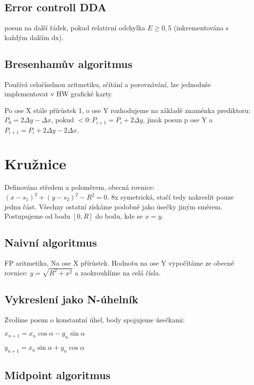 \documentclass[a4paper, 11pt]{report}
\begin{document}
\subsection{Error controll DDA}

posun na další řádek, pokud relativní odchylka $ E \geq 0,5$ (inkrementována s každým dalším dx).

\subsection{Bresenhamův algoritmus}

Používá celočíselnou aritmetiku, sčítání a porovnávání, lze jednoduše implementovat v HW grafické karty.

Po ose X stále přírůstek 1, o ose Y rozhodujeme na základě znaménka prediktoru: $P_0 = 2 \Delta y - \Delta x$, pokud $ < 0: P_{i+1} = P_i + 2\Delta y$, jinak posun p ose Y a $P_{i+1} = P_i + 2\Delta y - 2 \Delta x$.

\section{Kružnice}

Definována středem a poloměrem, obecná rovnice: $(x-s_1)^2 + (y-s_2)^2 - R^2 = 0$. 8x symetrická, stačí tedy nakreslit pouze jednu část. Všechny ostatní získáme podobně jako úsečky jiným směrem. Postupujeme od bodu $[0, R]$ do bodu, kde se $x = y$.

\subsection{Naivní algoritmus}
FP aritmetika, Na ose X přírůstek. Hodnotu na ose Y vypočítáme ze obecné rovnice: $y = \sqrt{R^2 + x^2}$ a zaokrouhlíme na celá čísla.

\subsection{Vykreslení jako N-úhelník}

Zvolíme posun o konstantní úhel, body spojujeme úsečkami:

$x_{n+1} = x_n \cos{\alpha} - y_n \sin{\alpha}$

$y_{n+1} = x_n \sin{\alpha} + y_n \cos{\alpha}$

\subsection{Midpoint algoritmus}
\end{document}
